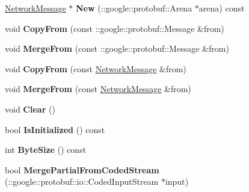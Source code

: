 \begin{DoxyCompactItemize}
\item 
\hypertarget{classSimpleChat_1_1NetworkMessage_a0a05f8f5dd8138da2f3de39de8043ff2}{\hyperlink{classSimpleChat_1_1NetworkMessage}{Network\-Message} $\ast$ {\bfseries New} (\-::google\-::protobuf\-::\-Arena $\ast$arena) const }\label{classSimpleChat_1_1NetworkMessage_a0a05f8f5dd8138da2f3de39de8043ff2}

\item 
\hypertarget{classSimpleChat_1_1NetworkMessage_a13212b0add820b37943801510adf68e6}{void {\bfseries Copy\-From} (const \-::google\-::protobuf\-::\-Message \&from)}\label{classSimpleChat_1_1NetworkMessage_a13212b0add820b37943801510adf68e6}

\item 
\hypertarget{classSimpleChat_1_1NetworkMessage_a4ebdf50d9a86c243fe00ba7b5f913a35}{void {\bfseries Merge\-From} (const \-::google\-::protobuf\-::\-Message \&from)}\label{classSimpleChat_1_1NetworkMessage_a4ebdf50d9a86c243fe00ba7b5f913a35}

\item 
\hypertarget{classSimpleChat_1_1NetworkMessage_a7fbc5949aaa3375591fc084407add520}{void {\bfseries Copy\-From} (const \hyperlink{classSimpleChat_1_1NetworkMessage}{Network\-Message} \&from)}\label{classSimpleChat_1_1NetworkMessage_a7fbc5949aaa3375591fc084407add520}

\item 
\hypertarget{classSimpleChat_1_1NetworkMessage_a6515a8b8adf203fd8bedb18db80b0e74}{void {\bfseries Merge\-From} (const \hyperlink{classSimpleChat_1_1NetworkMessage}{Network\-Message} \&from)}\label{classSimpleChat_1_1NetworkMessage_a6515a8b8adf203fd8bedb18db80b0e74}

\item 
\hypertarget{classSimpleChat_1_1NetworkMessage_afde8955d5b8daa35c399519b8a2c2f71}{void {\bfseries Clear} ()}\label{classSimpleChat_1_1NetworkMessage_afde8955d5b8daa35c399519b8a2c2f71}

\item 
\hypertarget{classSimpleChat_1_1NetworkMessage_afa900a259b82c3ea24e46ed98c5218c1}{bool {\bfseries Is\-Initialized} () const }\label{classSimpleChat_1_1NetworkMessage_afa900a259b82c3ea24e46ed98c5218c1}

\item 
\hypertarget{classSimpleChat_1_1NetworkMessage_a9245cbc44a5b79bab63bfc6abb599228}{int {\bfseries Byte\-Size} () const }\label{classSimpleChat_1_1NetworkMessage_a9245cbc44a5b79bab63bfc6abb599228}

\item 
\hypertarget{classSimpleChat_1_1NetworkMessage_a253f261555a96b562812625ed49678e1}{bool {\bfseries Merge\-Partial\-From\-Coded\-Stream} (\-::google\-::protobuf\-::io\-::\-Coded\-Input\-Stream $\ast$input)}\label{classSimpleChat_1_1NetworkMessage_a253f261555a96b562812625ed49678e1}


\end{DoxyCompactItemize}
